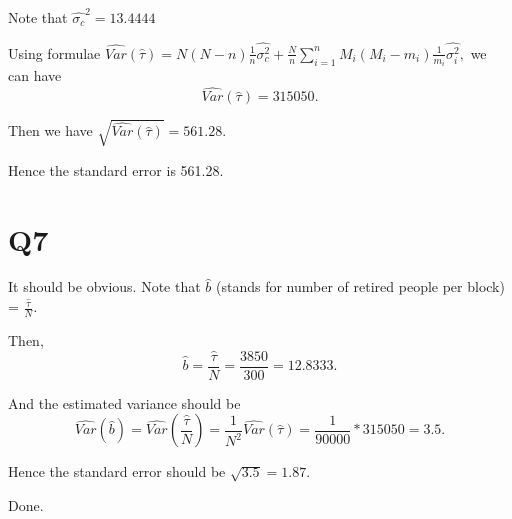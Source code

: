 \documentclass[12pt]{article}%
\begin{document}
Note that $\hat{\sigma_c}^2 = 13.4444$

Using formulae $\hat{Var}(\hat{\tau})=N(N-n)\frac{1}{n}\hat{\sigma_c^2} + \frac{N}{n}\sum_{i=1}^{n}M_i(M_i-m_i)\frac{1}{m_i}\hat{\sigma_i^2},$ we can have $$\hat{Var}(\hat{\tau})=315050.$$

Then we have $\sqrt{\hat{Var}(\hat{\tau})}=561.28.$

Hence the standard error is 561.28.




\section{Q7}
It should be obvious. Note that $\hat{b}$ (stands for number of retired people per block) = $\frac{\hat{\tau}}{N}.$ 

Then, $$\hat{b} = \frac{\hat{\tau}}{N} = \frac{3850}{300}=12.8333.$$

And the estimated variance should be $$\hat{Var}(\hat{b})=\hat{Var}( \frac{\hat{\tau}}{N} )= \frac{1}{N^2} \hat{Var}(\hat{\tau}) = \frac{1}{90000}*315050 = 3.5.$$

Hence the standard error should be $\sqrt{3.5}=1.87.$

Done.
\end{document}
